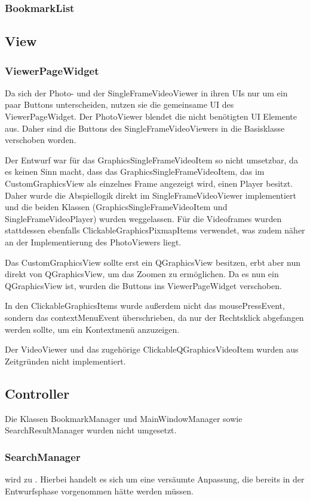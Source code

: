 \subsubsection{BookmarkList}

\subsection{View}
\subsubsection{ViewerPageWidget}
Da sich der Photo- und der SingleFrameVideoViewer in ihren UIs nur um ein paar Buttons unterscheiden, nutzen sie die gemeinsame UI des ViewerPageWidget. Der PhotoViewer blendet die nicht benötigten UI Elemente aus. Daher sind die Buttons des SingleFrameVideoViewers in die Basisklasse verschoben worden.

Der Entwurf war für das GraphicsSingleFrameVideoItem so nicht umsetzbar, da es keinen Sinn macht, dass das GraphicsSingleFrameVideoItem, das im CustomGraphicsView als einzelnes Frame angezeigt wird, einen Player besitzt. Daher wurde die Abspiellogik direkt im SingleFrameVideoViewer implementiert und die beiden Klassen (GraphicsSingleFrameVideoItem und SingleFrameVideoPlayer) wurden weggelassen. Für die Videoframes wurden stattdessen ebenfalls ClickableGraphicsPixmapItems verwendet, was zudem näher an der Implementierung des PhotoViewers liegt.

Das CustomGraphicsView sollte erst ein QGraphicsView besitzen, erbt aber nun direkt von QGraphicsView, um das Zoomen zu ermöglichen. Da es nun ein QGraphicsView ist, wurden die Buttons ins ViewerPageWidget verschoben.

In den ClickableGraphicsItems wurde außerdem nicht das mousePressEvent, sondern das contextMenuEvent überschrieben, da nur der Rechtsklick abgefangen werden sollte, um ein Kontextmenü anzuzeigen.

Der VideoViewer und das zugehörige ClickableQGraphicsVideoItem wurden aus Zeitgründen nicht implementiert.

\subsection{Controller}
Die Klassen BookmarkManager und MainWindowManager sowie SearchResultManager wurden nicht umgesetzt.

\subsubsection{SearchManager}
 wird zu . Hierbei handelt es sich um eine versäumte Anpassung, die bereits in der Entwurfsphase vorgenommen hätte werden müssen.

